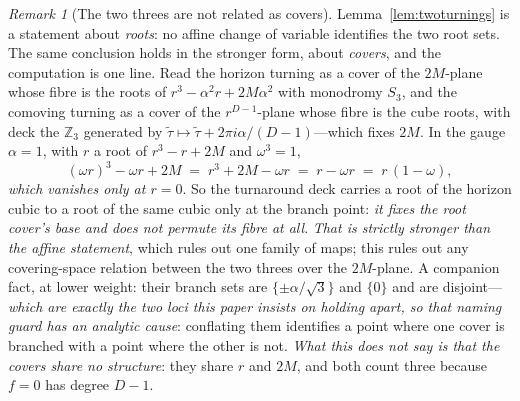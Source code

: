 \documentclass[11pt,a4paper]{article}
\theoremstyle{plain}
\theoremstyle{definition}
\theoremstyle{remark}
\newtheorem{remark}{Remark}
\begin{document}
\begin{remark}[The two threes are not related as covers]\label{rem:twocovers}
Lemma~\ref{lem:twoturnings} is a statement about \emph{roots}: no affine change of variable identifies the two
root sets. The same conclusion holds in the stronger form, about \emph{covers}, and the computation is one
line. Read the horizon turning as a cover of the $2M$-plane
whose fibre is the roots of $r^{3}-\alpha^{2}r+2M\alpha^{2}$ with monodromy $S_{3}$, and the comoving turning as a
cover of the $r^{D-1}$-plane whose fibre is the cube roots, with deck the $\mathbb{Z}_{3}$ generated by
$\tilde\tau\mapsto\tilde\tau+2\pi i\alpha/(D-1)$---which fixes $2M$. In the gauge $\alpha=1$, with $r$ a root
of $r^{3}-r+2M$ and $\omega^{3}=1$,
\[
(\omega r)^{3}-\omega r+2M \;=\; r^{3}+2M-\omega r \;=\; r-\omega r \;=\; r\,(1-\omega),
\]
\emph{which vanishes only at $r=0$}. So the turnaround deck carries a root of the horizon cubic to a root of the
same cubic only at the branch point: \emph{it fixes the root cover's base and does not permute its fibre at
all}. \emph{That is strictly stronger than the affine statement}, which rules out one family of maps; this rules
out any covering-space relation between the two threes over the $2M$-plane. A companion fact, at lower weight:
their branch sets are $\{\pm\alpha/\sqrt3\}$ and $\{0\}$ and are disjoint---\emph{which are exactly the two
loci this paper insists on holding apart, so that naming guard has an analytic cause}: conflating them
identifies a point where one cover is branched with a point where the other is not. \emph{What this does not
say is that the covers share no structure}: they share $r$ and $2M$, and both count three because $f=0$ has
degree $D-1$.
\end{remark}
\end{document}

